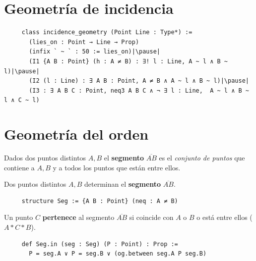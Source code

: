 \documentclass[t, aspectratio=169]{beamer}
\begin{document}
\section{Geometría de incidencia}
% 

\begin{frame}[fragile]
	\begin{lstlisting}
     class incidence_geometry (Point Line : Type*) :=
       (lies_on : Point → Line → Prop)
       (infix ` ~ ` : 50 := lies_on)|\pause|
       (I1 {A B : Point} (h : A ≠ B) : ∃! l : Line, A ~ l ∧ B ~ l)|\pause|
       (I2 (l : Line) : ∃ A B : Point, A ≠ B ∧ A ~ l ∧ B ~ l)|\pause|
       (I3 : ∃ A B C : Point, neq3 A B C ∧ ¬ ∃ l : Line,  A ~ l ∧ B ~ l ∧ C ~ l)
    \end{lstlisting}
\end{frame}


% 

\section{Geometría del orden}

\begin{frame}[fragile]
	\begin{defin*}
		Dados dos puntos distintos $A, B$ el \textbf{segmento}
		$\overline{AB}$ es el \textit{conjunto de puntos} que contiene a $A, B$ y a todos los
		puntos que están entre ellos.
	\end{defin*}
\end{frame}

\begin{frame}[fragile]
	\begin{defin*}
		Dos puntos distintos $A, B$ determinan el \textbf{segmento} $\overline{AB}$.
	\end{defin*}
	\begin{lstlisting}
     structure Seg := {A B : Point} (neq : A ≠ B)
    \end{lstlisting}

	\pause

	\begin{defin*}
		Un punto $C$ \textbf{pertenece} al segmento $\overline{AB}$
		si coincide con $A$ o $B$ o está entre ellos ($A * C * B$).
	\end{defin*}
	\begin{lstlisting}
     def Seg.in (seg : Seg) (P : Point) : Prop := 
       P = seg.A ∨ P = seg.B ∨ (og.between seg.A P seg.B)
    \end{lstlisting}
\end{frame}
\end{document}
